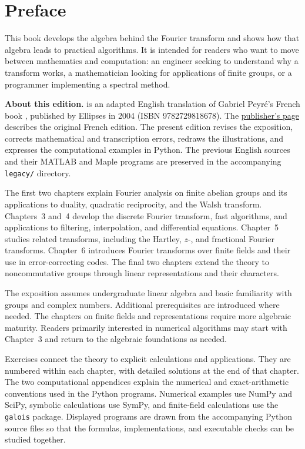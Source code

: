 \chapter*{Preface}

This book develops the algebra behind the Fourier transform and shows how that
algebra leads to practical algorithms. It is intended for readers who want to
move between mathematics and computation: an engineer seeking to understand why
a transform works, a mathematician looking for applications of finite groups,
or a programmer implementing a spectral method.

\medskip
\noindent\textbf{About this edition.}
\emph{\BookTitle} is an adapted English translation of Gabriel Peyr\'e's
French book \emph{\FrenchBookTitle}, published by Ellipses in 2004
(ISBN 9782729818678). The
\href{\FrenchBookURL}{publisher's page} describes the original French edition.
The present edition revises the exposition, corrects mathematical and
transcription errors, redraws the illustrations, and expresses the computational
examples in Python. The previous English sources and their MATLAB and Maple
programs are preserved in the accompanying \texttt{legacy/} directory.

\medskip
The first two chapters explain Fourier analysis on finite abelian groups and
its applications to duality, quadratic reciprocity, and the Walsh transform.
Chapters~3 and~4 develop the discrete Fourier transform, fast algorithms, and
applications to filtering, interpolation, and differential equations.
Chapter~5 studies related transforms, including the Hartley, $z$-, and
fractional Fourier transforms. Chapter~6 introduces Fourier transforms over
finite fields and their use in error-correcting codes. The final two chapters
extend the theory to noncommutative groups through linear representations and
their characters.

The exposition assumes undergraduate linear algebra and basic familiarity with
groups and complex numbers. Additional prerequisites are introduced where
needed. The chapters on finite fields and representations require more
algebraic maturity. Readers primarily interested in numerical algorithms may
start with Chapter~3 and return to the algebraic foundations as needed.

Exercises connect the theory to explicit calculations and applications. They
are numbered within each chapter, with detailed solutions at the end of that
chapter. The two computational appendices explain
the numerical and exact-arithmetic conventions used in the Python programs.
Numerical examples use NumPy and SciPy, symbolic calculations use SymPy, and
finite-field calculations use the \texttt{galois} package. Displayed programs
are drawn from the accompanying Python source files so that the formulas,
implementations, and executable checks can be studied together.

